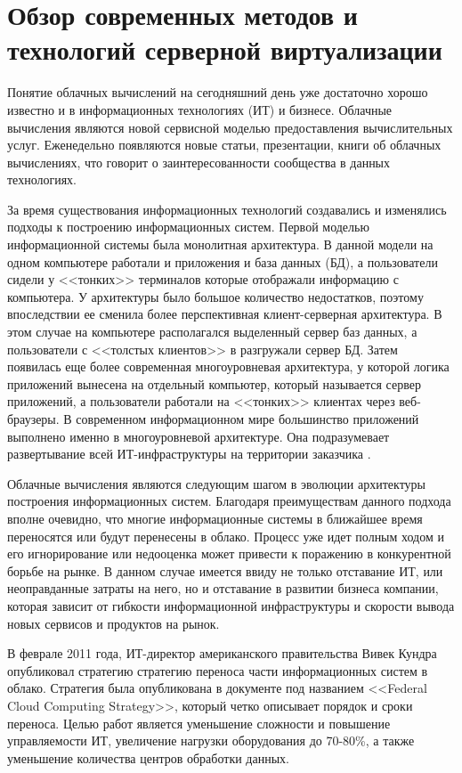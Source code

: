 \section{Обзор современных методов и технологий серверной виртуализации} \label{literature}

Понятие облачных вычислений на сегодняшний день уже достаточно хорошо известно и в информационных технологиях (ИТ) и бизнесе.
Облачные вычисления являются новой сервисной моделью предоставления вычислительных услуг.
Еженедельно появляются новые статьи, презентации, книги об облачных вычислениях, что говорит о заинтересованности сообщества в данных технологиях.

За время существования информационных технологий создавались и изменялись подходы к построению информационных систем.
Первой моделью информационной системы была монолитная архитектура.
В данной модели на одном компьютере работали и приложения и база данных (БД), а пользователи сидели у <<тонких>> терминалов которые отображали информацию с компьютера.
У архитектуры было большое количество недостатков, поэтому впоследствии ее сменила более перспективная клиент-серверная архитектура.
В этом случае на компьютере располагался выделенный сервер баз данных, а пользователи с <<толстых клиентов>> в разгружали сервер БД.
Затем появилась еще более современная многоуровневая архитектура, у которой логика приложений вынесена на отдельный компьютер, который называется сервер приложений, а пользователи работали на <<тонких>> клиентах через веб-браузеры.
В современном информационном мире большинство приложений выполнено именно в многоуровневой архитектуре.
Она подразумевает развертывание всей ИТ-инфраструктуры на территории заказчика \cite{oracle-db}.

Облачные вычисления являются следующим шагом в эволюции архитектуры построения информационных систем.
Благодаря преимуществам данного подхода вполне очевидно, что многие информационные системы в ближайшее время переносятся или будут перенесены в облако.
Процесс уже идет полным ходом и его игнорирование или недооценка может привести к поражению в конкурентной борьбе на рынке.
В данном случае имеется ввиду не только отставание ИТ, или неоправданные затраты на него, но и отставание в развитии бизнеса компании, которая зависит от гибкости информационной инфраструктуры и скорости вывода новых сервисов и продуктов на рынок.

В феврале 2011 года, ИТ-директор американского правительства Вивек Кундра опубликовал стратегию стратегию переноса части информационных систем в облако.
Стратегия была опубликована в документе под названием <<Federal Cloud Computing Strategy>>, который четко описывает порядок и сроки переноса.
Целью работ является уменьшение сложности и повышение управляемости ИТ, увеличение нагрузки оборудования до 70-80\%, а также уменьшение количества центров обработки данных.

